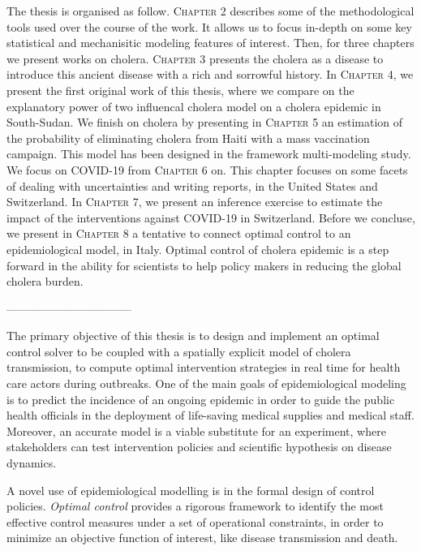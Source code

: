 The thesis is organised as follow. \textsc{Chapter 2} describes some of the methodological tools used over the course of the work. It allows us to focus in-depth on some key statistical and mechanisitic modeling features of interest. Then, for three chapters we present works on cholera. \textsc{Chapter 3} presents the cholera as a disease to introduce this ancient disease with a rich and sorrowful history. In  \textsc{Chapter 4}, we present the first original work of this thesis, where we compare on the explanatory power of two influencal cholera model on a cholera epidemic in South-Sudan.  We finish on cholera by presenting in \textsc{Chapter 5} an estimation of the probability of eliminating cholera from Haiti with a mass vaccination campaign. This model has been designed in the framework multi-modeling study. We focus on COVID-19 from \textsc{Chapter 6} on. This chapter focuses on some facets of dealing with uncertainties and writing reports, in the United States and Switzerland. In   \textsc{Chapter 7}, we present an inference exercise to estimate the impact of the interventions against COVID-19 in Switzerland. Before we concluse, we present in \textsc{Chapter 8} a tentative to connect optimal control to an epidemiological model, in Italy. Optimal control of cholera epidemic is a step forward in the ability for scientists to help policy makers in reducing the global cholera burden. 


---------------------------------

The  primary objective of this thesis is to design and implement an optimal control solver to be coupled with a spatially explicit model of cholera transmission, to compute optimal intervention strategies in real time for health care actors during outbreaks.
One of the main goals of epidemiological modeling is to predict the incidence of an ongoing epidemic in order to guide the public health officials in the deployment of life-saving medical supplies and medical staff. Moreover, an accurate model is a viable substitute for an experiment, where stakeholders can test intervention policies and scientific hypothesis on disease dynamics.

A novel use of epidemiological modelling is in the formal design of control policies. \textit{Optimal control} provides a rigorous framework to identify the most effective control measures under a set of operational constraints, in order to minimize an objective function of interest, like disease transmission and death. 

